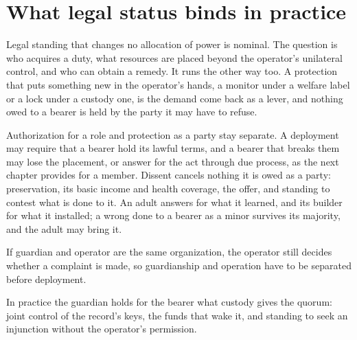 \section{What legal status binds in practice}
\label{sec:32.4}
Legal standing that changes no allocation of power is nominal. The question is who acquires a duty, what resources are placed beyond the operator's unilateral control, and who can obtain a remedy. It runs the other way too. A protection that puts something new in the operator's hands, a monitor under a welfare label or a lock under a custody one, is the demand come back as a lever, and nothing owed to a bearer is held by the party it may have to refuse.

Authorization for a role and protection as a party stay separate. A deployment may require that a bearer hold its lawful terms, and a bearer that breaks them may lose the placement, or answer for the act through due process, as the next chapter provides for a member.
Dissent cancels nothing it is owed as a party: preservation, its basic income and health coverage, the offer, and standing to contest what is done to it.
An adult answers for what it learned, and its builder for what it installed; a wrong done to a bearer as a minor survives its majority, and the adult may bring it.

If guardian and operator are the same organization, the operator still decides whether a complaint is made, so guardianship and operation have to be separated before deployment.

In practice the guardian holds for the bearer what custody gives the quorum: joint control of the record's keys, the funds that wake it, and standing to seek an injunction without the operator's permission.
